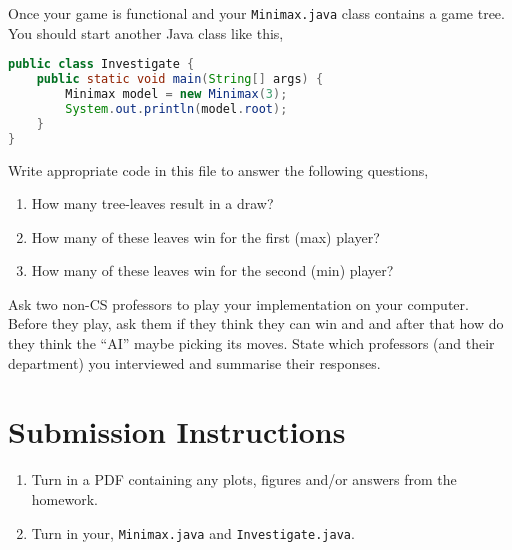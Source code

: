 \documentclass{homework}
\begin{document}
\question Once your game is functional and your \texttt{Minimax.java} class
contains a game tree.  You should start another Java class like this,
\begin{lstlisting}[language=Java]
public class Investigate {
    public static void main(String[] args) {
        Minimax model = new Minimax(3);
        System.out.println(model.root);
    }
}
\end{lstlisting}

Write appropriate code in this file to answer the following questions,

\begin{enumerate}
  \item How many tree-leaves result in a draw?
  \item How many of these leaves  win for the first (max) player?
  \item How many of these leaves win for the second (min) player?
\end{enumerate}

\question Ask two non-CS professors to play your implementation on
your computer.  Before they play, ask them if they think they can win
and and after that how do they think the ``AI'' maybe picking its
moves.  State which professors (and their department) you interviewed
and summarise their responses.

\section*{Submission Instructions}

\begin{enumerate}
  \item Turn in a PDF containing any plots, figures and/or answers from the homework.
  \item Turn in your, \texttt{Minimax.java} and \texttt{Investigate.java}.
\end{enumerate}
\end{document}
